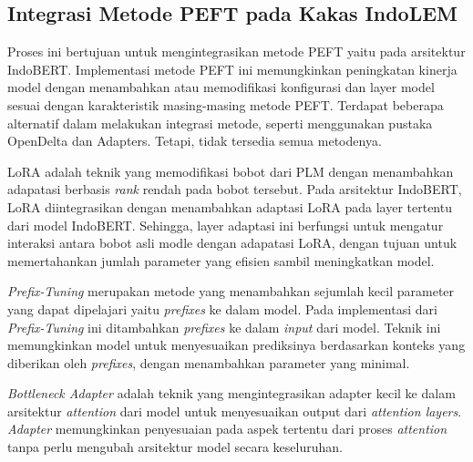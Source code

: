 \subsection{Integrasi Metode PEFT pada Kakas IndoLEM}

Proses ini bertujuan untuk mengintegrasikan metode PEFT yaitu \methodPEFT pada arsitektur IndoBERT. Implementasi metode PEFT ini memungkinkan peningkatan kinerja model dengan menambahkan atau memodifikasi konfigurasi dan layer model sesuai dengan karakteristik masing-masing metode PEFT. Terdapat beberapa alternatif dalam melakukan integrasi metode, seperti menggunakan pustaka OpenDelta dan Adapters. Tetapi, tidak tersedia semua metodenya.

LoRA adalah teknik yang memodifikasi bobot dari PLM  dengan menambahkan adapatasi berbasis \textit{rank} rendah pada bobot tersebut. Pada arsitektur IndoBERT, LoRA diintegrasikan dengan menambahkan adaptasi LoRA pada layer tertentu dari model IndoBERT. Sehingga, layer adaptasi ini berfungsi untuk mengatur interaksi antara bobot asli modle dengan adapatasi LoRA, dengan tujuan untuk memertahankan jumlah parameter yang efisien sambil meningkatkan model.

\textit{Prefix-Tuning} merupakan metode yang menambahkan sejumlah kecil parameter yang dapat dipelajari yaitu \textit{prefixes} ke dalam model. Pada implementasi dari \textit{Prefix-Tuning} ini  ditambahkan \textit{prefixes} ke dalam \textit{input} dari model. Teknik ini memungkinkan model untuk menyesuaikan prediksinya berdasarkan konteks yang diberikan oleh \textit{prefixes}, dengan menambahkan parameter yang minimal. 

\textit{Bottleneck Adapter} adalah teknik yang mengintegrasikan adapter kecil ke dalam arsitektur \textit{attention} dari model untuk menyesuaikan output dari \textit{attention layers}. \textit{Adapter} memungkinkan penyesuaian pada aspek tertentu dari proses \textit{attention} tanpa perlu mengubah arsitektur model secara keseluruhan.

